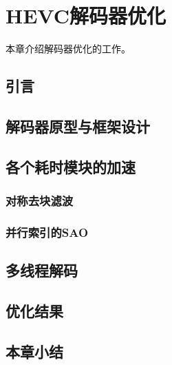 \chapter{HEVC解码器优化}
本章介绍解码器优化的工作。

\section{引言}

\section{解码器原型与框架设计}

\section{各个耗时模块的加速}

\subsection{对称去块滤波}

\subsection{并行索引的SAO}

\section{多线程解码}

\section{优化结果}

\section{本章小结}